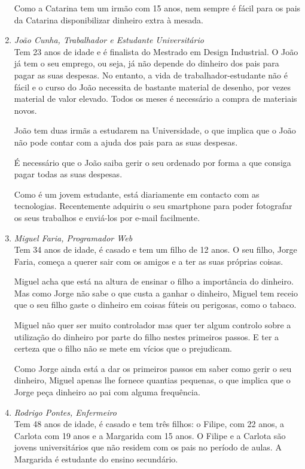\documentclass[12pt,a4paper]{article}
\begin{document}
\begin{enumerate}
            Como a Catarina tem um irmão com 15 anos, nem sempre é fácil para os pais da Catarina disponibilizar dinheiro extra à mesada.

      \item \emph{João Cunha, Trabalhador e Estudante Universitário}\\
            Tem 23 anos de idade e é finalista do Mestrado em Design Industrial. O João já tem o seu emprego, ou seja, já não depende do dinheiro dos pais para pagar as suas despesas. No entanto, a vida de trabalhador-estudante não é fácil e o curso do João necessita de bastante material de desenho, por vezes material de valor elevado. Todos os meses é necessário a compra de materiais novos.

            João tem duas irmãs a estudarem na Universidade, o que implica que o João não pode contar com a ajuda dos pais para as suas despesas.

            É necessário que o João saiba gerir o seu ordenado por forma a que consiga pagar todas as suas despesas.

            Como é um jovem estudante, está diariamente em contacto com as tecnologias. Recentemente adquiriu o seu smartphone para poder fotografar os seus trabalhos e enviá-los por e-mail facilmente.

      \item \emph{Miguel Faria, Programador Web}\\
            Tem 34 anos de idade, é casado e tem um filho de 12 anos. O seu filho, Jorge Faria, começa a querer sair com os amigos e a ter as suas próprias coisas.

            Miguel acha que está na altura de ensinar o filho a importância do dinheiro. Mas como Jorge não sabe o que custa a ganhar o dinheiro, Miguel tem receio que o seu filho gaste o dinheiro em coisas fúteis ou perigosas, como o tabaco.

            Miguel não quer ser muito controlador mas quer ter algum controlo sobre a utilização do dinheiro por parte do filho nestes primeiros passos. E ter a certeza que o filho não se mete em vícios que o prejudicam.

            Como Jorge ainda está a dar os primeiros passos em saber como gerir o seu dinheiro, Miguel apenas lhe fornece quantias pequenas, o que implica que o Jorge peça dinheiro ao pai com alguma frequência.

      \item \emph{Rodrigo Pontes, Enfermeiro}\\
            Tem 48 anos de idade, é casado e tem três filhos: o Filipe, com 22 anos, a Carlota com 19 anos e a Margarida com 15 anos. O Filipe e a Carlota são jovens universitários que não residem com os pais no período de aulas. A Margarida é estudante do ensino secundário.


\end{enumerate}
\end{document}
